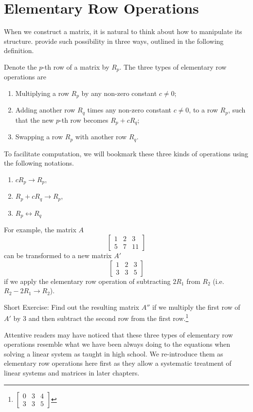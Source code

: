 \section{Elementary Row Operations}
When we construct a matrix, it is natural to think about how to manipulate its structure.  provide such possibility in three ways, outlined in the following definition.
\begin{defn}
\label{defn:elerowop}
Denote the $p$-th row of a matrix by $R_{p}$. The three types of elementary row operations are
\begin{enumerate}
\item Multiplying a row $R_{p}$ by any non-zero constant $c \neq 0$;
\item Adding another row $R_{q}$ times any non-zero constant $c \neq 0$, to a row $R_{p}$, such that the new $p$-th row becomes $R_{p} + cR_{q}$;
\item Swapping a row $R_{p}$ with another row $R_{q}$.
\end{enumerate}
To facilitate computation, we will bookmark these three kinds of operations using the following notations.
\begin{enumerate}
\item $cR_{p} \rightarrow R_{p}$,
\item $R_{p} + cR_{q} \rightarrow R_{p}$,
\item $R_{p} \leftrightarrow R_{q}$
\end{enumerate}
\end{defn}
For example, the matrix $A$
\begin{equation*}
\begin{bmatrix}
1 & 2 & 3 \\
5 & 7 & 11
\end{bmatrix}
\end{equation*}
can be transformed to a new matrix $A'$
\begin{equation*}
\begin{bmatrix}
1 & 2 & 3 \\
3 & 3 & 5
\end{bmatrix}
\end{equation*}
if we apply the elementary row operation of subtracting $2R_1$ from $R_2$  (i.e.\ $R_2 - 2R_1 \to R_2$). \par
Short Exercise: Find out the resulting matrix $A''$ if we multiply the first row of $A'$ by $3$ and then subtract the second row from the first row.\footnote{
$\begin{bmatrix}
0 & 3 & 4 \\
3 & 3 & 5
\end{bmatrix}$}\par
Attentive readers may have noticed that these three types of elementary row operations resemble what we have been always doing to the equations when solving a linear system as taught in high school. We re-introduce them as elementary row operations here first as they allow a systematic treatment of linear systems and matrices in later chapters.

